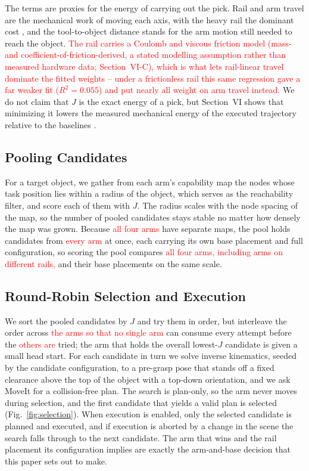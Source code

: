 \documentclass[conference]{IEEEtran}
\begin{document}
The terms are proxies for the energy of carrying out the pick. Rail and arm travel are
the mechanical work of moving each axis, with the heavy rail the dominant cost
\cite{MoMaPos2024,BaSeNet2024}, and the tool-to-object distance stands for the arm motion
still needed to reach the object. \textcolor{red}{The rail carries a Coulomb and viscous
friction model (mass- and coefficient-of-friction-derived, a stated modelling assumption
rather than measured hardware data; Section~VI-C), which is what lets rail-linear travel
dominate the fitted weights -- under a frictionless rail this same regression gave a far
weaker fit ($R^2=0.055$) and put nearly all weight on arm travel instead.} We do not claim
that $J$ is the exact energy of a pick, but Section~VI shows that minimizing it lowers the
measured mechanical energy of the executed trajectory relative to the baselines \cite{EnergySLR2024}.

\subsection{Pooling Candidates}

For a target object, we gather from each arm's capability map the nodes whose task
position lies within a radius of the object, which serves as the reachability
filter, and score each of them with $J$. The radius scales with the node spacing of
the map, so the number of pooled candidates stays stable no matter how densely the
map was grown. Because \textcolor{red}{all four arms} have separate maps, the pool holds candidates
from \textcolor{red}{every arm} at once, each carrying its own base placement and full
configuration, so scoring the pool compares \textcolor{red}{all four arms, including arms on different rails,} and their base placements
on the same scale.

\subsection{Round-Robin Selection and Execution}

We sort the pooled candidates by $J$ and try them in order, but interleave the
order across \textcolor{red}{the arms so that no single arm} can consume every attempt before the
\textcolor{red}{others are} tried; the arm that holds the overall lowest-$J$ candidate is given a
small head start. For each candidate in turn we solve inverse kinematics, seeded by
the candidate configuration, to a pre-grasp pose that stands off a fixed clearance
above the top of the object with a top-down orientation, and we ask MoveIt for a
collision-free plan. The search is plan-only, so the arm never moves during
selection, and the first candidate that yields a valid plan is selected
(Fig.~\ref{fig:selection}). When execution is enabled, only the selected candidate
is planned and executed, and if execution is aborted by a change in the scene the
search falls through to the next candidate. The arm that wins and the rail
placement its configuration implies are exactly the arm-and-base decision that this
paper sets out to make.
\end{document}
